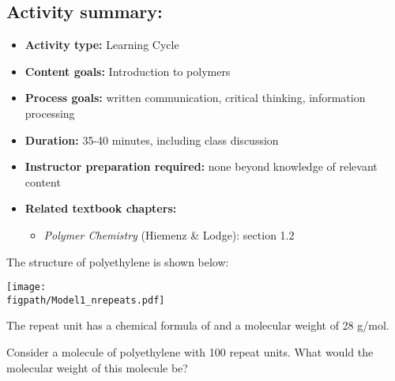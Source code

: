 \begin{activity}
\begin{instructornotes}
	\subsection*{Activity summary:}
	\begin{itemize}
		\item \textbf{Activity type:} Learning Cycle
		\item \textbf{Content goals:} Introduction to polymers
		\item \textbf{Process goals:} %
			written communication, critical thinking, information processing
		\item \textbf{Duration:} 35-40 minutes, including class discussion
		\item \textbf{Instructor preparation required:} none beyond knowledge of relevant content
		\item \textbf{Related textbook chapters:}
			\begin{itemize}
				\item \emph{Polymer Chemistry} (Hiemenz \& Lodge): section 1.2
			\end{itemize}
	\end{itemize}
	
\end{instructornotes}




\begin{model}
\label{\labelbase:mdl:polyethyleneMW}

	The structure of polyethylene is shown below:

	\vspace{6pt}
	\centerline{\texttt{[image: \\figpath/Model1\_nrepeats.pdf]}}
	\vspace{6pt}
	
	The repeat unit has a chemical formula of  and a molecular weight of 28 g/mol.

\end{model}


\begin{ctqs}

	\question Consider a molecule of polyethylene with 100 repeat units.  What would the molecular weight of this molecule be?
			

\end{ctqs}
\end{activity}
